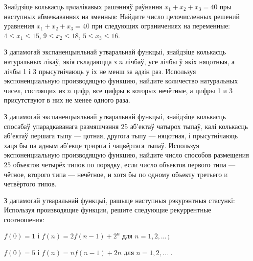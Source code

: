\begin{problemList}
\problemItemWithCommonPart
{Знайдзіце колькасць цэлалікавых рашэнняў раўнання $x_1 + x_2 + x_3 = 40$ пры наступных
абмежаваннях на зменныя:}
{Найдите число целочисленных решений уравнения $x_1 + x_2 + x_3 = 40$ при
следующих ограничениях на переменные:}
{$4 \le x_1 \le 15$, $9 \le x_2 \le 18$, $5 \le x_3 \le 16$.}

\problemItemSimple
{З дапамогай экспаненцыяльнай утваральнай функцыі, знайдзіце колькасць натуральных лікаў,
якія складаюцца з $n$ лічбаў, усе лічбы ў якіх няцотныя, а лічбы 1 і 3 прысутнічаюць у іх
не менш за адзін раз.}
{Используя экспоненциальную производящую функцию, найдите количество
натуральных чисел, состоящих из $n$ цифр, все цифры в которых нечётные, а цифры 1 и 3
присутствуют в них не менее одного раза.}

\problemItemSimple
{З дапамогай экспаненцыяльнай утваральнай функцыі, знайдзіце колькасць спосабаў упарадкаванага размяшчэння
25 аб'ектаў чатырох тыпаў, калі колькасць аб'ектаў першага тыпу --- цотная, другога тыпу --- няцотная,
і прысутнічаюць хаця бы па адным аб'екце трэцяга і чацвёртага тыпаў.}
{Используя экспоненциальную производящую функцию, найдите число способов
размещения 25 объектов четырёх типов по порядку, если число объектов первого
типа --- чётное, второго типа --- нечётное, и хотя бы по одному объекту третьего и
четвёртого типов.}

\problemItemWithCommonPart
{З дапамогай утваральнай функцыі, рашыце наступныя рэкурэнтныя стасункі:}
{Используя производящие функции, решите следующие рекуррентные соотношения:}
{\begin{belarusianEnumerate}
  \item $f(0) = 1$ і $f(n) = 2f(n - 1) + 2^n$ для $n = 1, 2, \ldots\, $;
  \item $f(0) = 5$ і $f(n) = nf(n - 1) + 2n$ для $n = 1, 2, \ldots\,\, $.
\end{belarusianEnumerate}}

\end{problemList}


